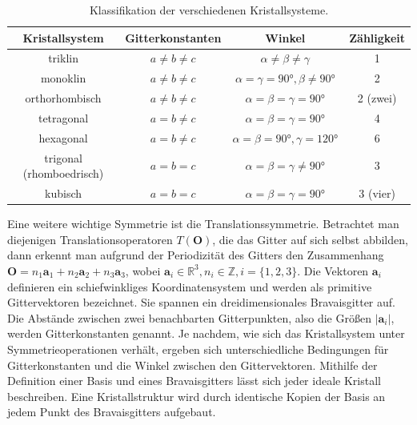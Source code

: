 \begin{table}[h]
    \centering
    \begin{tabular}{c c c c}
        \toprule
        Kristallsystem           & Gitterkonstanten  & Winkel                                       & Zähligkeit \\ \midrule
        triklin                  & $a \neq b \neq c$ & $\alpha \neq\beta \neq\gamma$                & 1          \\
        monoklin                 & $a \neq b \neq c$ & $\alpha=\gamma=\ang{90},\beta \neq \ang{90}$ & 2          \\
        orthorhombisch           & $a \neq b \neq c$ & $\alpha=\beta=\gamma=\ang{90}$               & 2 (zwei)   \\
        tetragonal               & $a = b \neq c$    & $\alpha=\beta=\gamma=\ang{90}$               & 4          \\
        hexagonal                & $a = b \neq c$    & $\alpha=\beta=\ang{90}, \gamma=\ang{120}$    & 6          \\
        trigonal (rhomboedrisch) & $a=b=c$           & $\alpha=\beta=\gamma \neq \ang{90}$          & 3          \\
        kubisch                  & $a=b=c$           & $\alpha=\beta=\gamma=\ang{90}$               & 3 (vier)   \\ \bottomrule
    \end{tabular}
    \caption{Klassifikation der verschiedenen Kristallsysteme.  }
    \label{tab:krystallsysteme}
\end{table}

Eine weitere wichtige Symmetrie ist die Translationssymmetrie.
Betrachtet man diejenigen Translationsoperatoren $T(\mathbf{O})$, die das Gitter auf sich selbst abbilden, dann erkennt
man aufgrund der Periodizität des Gitters den Zusammenhang
$\mathbf{O} = n_{1}\mathbf{a}_{1}+n_{2}\mathbf{a}_{2}+n_{3}\mathbf{a}_{3}$, wobei
$\mathbf{a}_{i}\in\mathbb{R}^{3}, n_{i}\in\mathbb{Z}, i=\{1,2,3\}$. \autocite[50]{Hunklinger}
Die Vektoren $\mathbf{a}_{i}$
definieren ein schiefwinkliges Koordinatensystem und werden als primitive Gittervektoren bezeichnet.
Sie spannen ein dreidimensionales Bravaisgitter auf.
Die Abstände zwischen zwei benachbarten Gitterpunkten, also die Größen
$\lvert \mathbf{a}_{i} \rvert$, werden Gitterkonstanten genannt. \autocite[82]{Ashcroft}
Je nachdem, wie sich das Kristallsystem unter Symmetrieoperationen verhält, ergeben sich unterschiedliche Bedingungen für
Gitterkonstanten und die Winkel zwischen den Gittervektoren.
Mithilfe der Definition einer Basis und eines Bravaisgitters lässt sich jeder ideale Kristall beschreiben.
Eine Kristallstruktur wird durch identische Kopien der Basis an jedem Punkt des Bravaisgitters aufgebaut.
\autocite[94-95]{Ashcroft}

